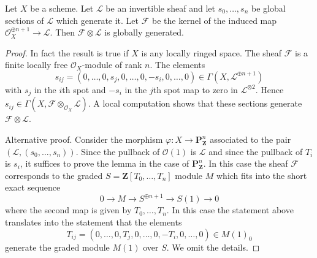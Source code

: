 \begin{lemma}
\label{lemma-globally-generated-omega-twist-1}
Let $X$ be a scheme. Let $\mathcal{L}$ be an invertible sheaf
and let $s_0, \ldots, s_n$ be global sections of $\mathcal{L}$
which generate it. Let $\mathcal{F}$ be the kernel of the induced
map $\mathcal{O}_X^{\oplus n + 1} \to \mathcal{L}$.
Then $\mathcal{F} \otimes \mathcal{L}$ is globally generated.
\end{lemma}

\begin{proof}
In fact the result is true if $X$ is any locally ringed space.
The sheaf $\mathcal{F}$ is a finite locally free $\mathcal{O}_X$-module
of rank $n$. The elements
$$
s_{ij} = (0, \ldots, 0, s_j, 0, \ldots, 0, -s_i, 0, \ldots, 0)
\in \Gamma(X, \mathcal{L}^{\oplus n + 1})
$$
with $s_j$ in the $i$th spot and $-s_i$ in the $j$th spot map to zero
in $\mathcal{L}^{\otimes 2}$. Hence
$s_{ij} \in \Gamma(X, \mathcal{F} \otimes_{\mathcal{O}_X} \mathcal{L})$.
A local computation shows that these sections generate
$\mathcal{F} \otimes \mathcal{L}$.

\medskip\noindent
Alternative proof. Consider the morphism
$\varphi : X \to \mathbf{P}^n_\mathbf{Z}$ associated to
the pair $(\mathcal{L}, (s_0, \ldots, s_n))$. Since the pullback
of $\mathcal{O}(1)$ is $\mathcal{L}$ and since the pullback
of $T_i$ is $s_i$, it suffices to prove the lemma in the
case of $\mathbf{P}^n_\mathbf{Z}$. In this case the sheaf
$\mathcal{F}$ corresponds to the graded $S = \mathbf{Z}[T_0, \ldots, T_n]$
module $M$ which fits into the short exact sequence
$$
0 \to M \to S^{\oplus n + 1} \to S(1) \to 0
$$
where the second map is given by $T_0, \ldots, T_n$. In this
case the statement above translates into the statement that
the elements
$$
T_{ij} = (0, \ldots, 0, T_j, 0, \ldots, 0, -T_i, 0, \ldots, 0)
\in M(1)_0
$$
generate the graded module $M(1)$ over $S$. We omit the details.
\end{proof}








